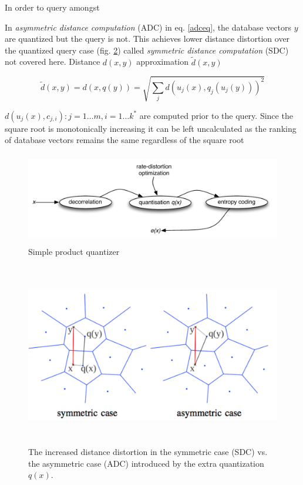 \documentclass[english,12pt,a4paper,pdftex,elec,utf8]{aaltothesis}
\begin{document}
In order to query amongst

In \emph{asymmetric distance computation} (ADC) in eq. \ref{adceq}, the database vectors $y$ are quantized but the query is not. This achieves lower distance distortion over the quantized query case (fig. \ref{nosdc}) called \emph{symmetric distance computation} (SDC) not covered here. Distance $d(x,y)$ approximation $\tilde{d}(x,y)$

\begin{equation}
  \label{adceq}
  \tilde{d}(x,y)=d(x, q(y))=\sqrt{\sum_jd(u_j(x),q_j(u_j(y)))^2}
\end{equation}

$d(u_j(x),c_{j,i}) : j = 1\ldots m,i=1\ldots k^*$ are computed prior to the query. Since the square root is monotonically increasing it can be left uncalculated as the ranking of database vectors remains the same regardless of the square root\cite{Jegou2011}

\begin{figure}[htb]
\begin{center}
\includegraphics[height=4cm]{figures/pq}
\end{center}
\caption{Simple product quantizer \cite{Jegou2014}}
\label{pqfig}
\end{figure}

\begin{figure}[htb]
\begin{center}
\includegraphics[height=8cm]{figures/sdcadc}
\end{center}
\caption{The increased distance distortion in the symmetric case (SDC) vs. the asymmetric case (ADC) introduced by the extra quantization $q(x)$. \cite{Jegou2008}}
\label{nosdc}
\end{figure}
\end{document}
